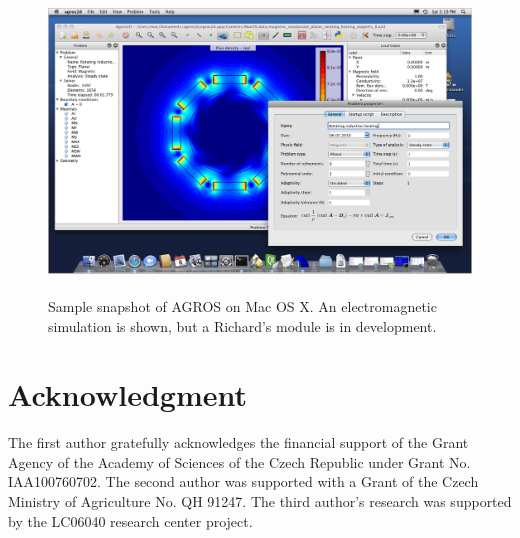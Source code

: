\documentclass[final,3p,times,twocolumn]{elsarticle}
\begin{document}
\begin{figure}[!ht]
\begin{center}
\includegraphics[height=8cm]{agros.png}
\end{center}
\vspace{-4mm}
\caption{Sample snapshot of AGROS on Mac OS X. An electromagnetic 
         simulation is shown, but a Richard's module is in development.}
\label{fig:agros}
\end{figure}



\section*{Acknowledgment}

The first author gratefully acknowledges the financial support
of the Grant Agency of the Academy of Sciences of the Czech 
Republic under Grant No. IAA100760702. The second author
was supported with a Grant of the Czech Ministry of Agriculture No.
QH 91247. The third author's research 
was supported by the LC06040 research center project. 




\end{document}
